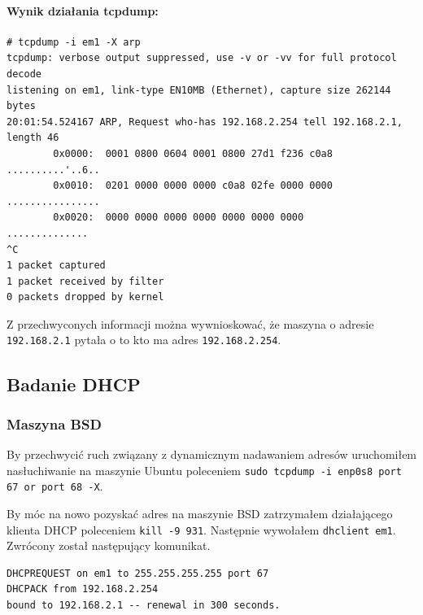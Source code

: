 \documentclass{mwart} %
\begin{document}
\paragraph{Wynik działania tcpdump:}
\begin{verbatim}
# tcpdump -i em1 -X arp
tcpdump: verbose output suppressed, use -v or -vv for full protocol decode
listening on em1, link-type EN10MB (Ethernet), capture size 262144 bytes
20:01:54.524167 ARP, Request who-has 192.168.2.254 tell 192.168.2.1, length 46 
        0x0000:  0001 0800 0604 0001 0800 27d1 f236 c0a8  ..........'..6..
        0x0010:  0201 0000 0000 0000 c0a8 02fe 0000 0000  ................
        0x0020:  0000 0000 0000 0000 0000 0000 0000       ..............
^C
1 packet captured
1 packet received by filter
0 packets dropped by kernel
\end{verbatim}

Z przechwyconych informacji można wywnioskować, że maszyna o adresie \texttt{192.168.2.1} pytała o to kto ma adres \texttt{192.168.2.254}.

\subsection{Badanie DHCP}

\subsubsection{Maszyna BSD}
By przechwycić ruch związany z dynamicznym nadawaniem adresów uruchomiłem nasłuchiwanie na maszynie Ubuntu poleceniem \texttt{sudo tcpdump -i enp0s8 port 67 or port 68 -X}.

By móc na nowo pozyskać adres na maszynie BSD zatrzymałem działającego klienta DHCP poleceniem \texttt{kill -9 931}. Następnie wywołałem \texttt{dhclient em1}. Zwrócony został następujący komunikat.
\begin{verbatim}
DHCPREQUEST on em1 to 255.255.255.255 port 67 
DHCPACK from 192.168.2.254 
bound to 192.168.2.1 -- renewal in 300 seconds.
\end{verbatim}
\end{document}
